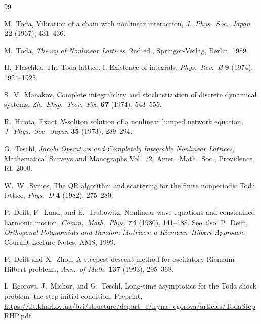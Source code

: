 \documentclass[12pt,a4paper]{article}
\theoremstyle{definition}
\begin{document}
\begin{thebibliography}{99}

M.~Toda,
\newblock Vibration of a chain with nonlinear interaction,
\newblock \emph{J.\ Phys.\ Soc.\ Japan} \textbf{22} (1967), 431--436.

M.~Toda,
\newblock \emph{Theory of Nonlinear Lattices}, 2nd ed.,
\newblock Springer-Verlag, Berlin, 1989.

H.~Flaschka,
\newblock The Toda lattice. I. Existence of integrals,
\newblock \emph{Phys.\ Rev.\ B} \textbf{9} (1974), 1924--1925.

S.~V.~Manakov,
\newblock Complete integrability and stochastization of discrete dynamical
  systems,
\newblock \emph{Zh.\ Eksp.\ Teor.\ Fiz.} \textbf{67} (1974), 543--555.

R.~Hirota,
\newblock Exact $N$-soliton solution of a nonlinear lumped network equation,
\newblock \emph{J.\ Phys.\ Soc.\ Japan} \textbf{35} (1973), 289--294.

G.~Teschl,
\newblock \emph{Jacobi Operators and Completely Integrable Nonlinear Lattices},
\newblock Mathematical Surveys and Monographs Vol.\ 72,
\newblock Amer.\ Math.\ Soc., Providence, RI, 2000.

W.~W.~Symes,
\newblock The QR algorithm and scattering for the finite nonperiodic Toda
  lattice,
\newblock \emph{Phys.\ D} \textbf{4} (1982), 275--280.

P.~Deift, F.~Lund, and E.~Trubowitz,
\newblock Nonlinear wave equations and constrained harmonic motion,
\newblock \emph{Comm.\ Math.\ Phys.} \textbf{74} (1980), 141--188.
\newblock See also: P.~Deift,
\newblock \emph{Orthogonal Polynomials and Random Matrices: a Riemann--Hilbert
  Approach},
\newblock Courant Lecture Notes, AMS, 1999.

P.~Deift and X.~Zhou,
\newblock A steepest descent method for oscillatory Riemann--Hilbert problems,
\newblock \emph{Ann.\ of Math.} \textbf{137} (1993), 295--368.

I.~Egorova, J.~Michor, and G.~Teschl,
\newblock Long-time asymptotics for the Toda shock problem: the step
  initial condition,
\newblock Preprint, \url{https://ilt.kharkov.ua/bvi/structure/depart_e/iryna_egorova/articles/TodaStepRHP.pdf}.


\end{thebibliography}
\end{document}
